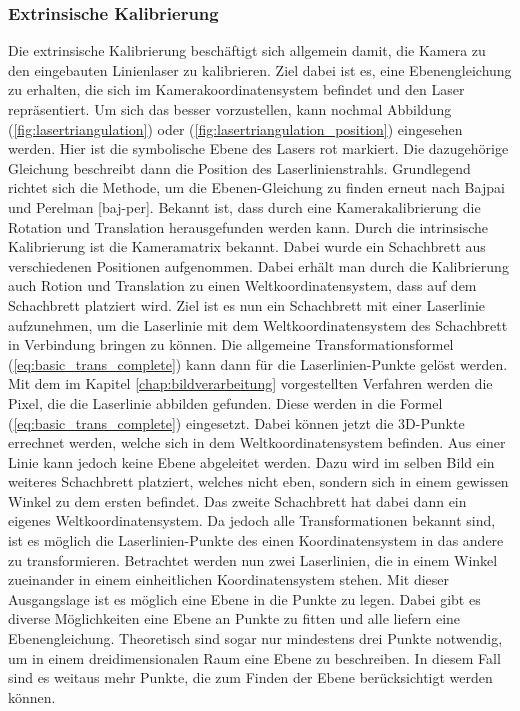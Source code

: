		\subsubsection{Extrinsische Kalibrierung}
		Die extrinsische Kalibrierung beschäftigt sich allgemein damit, die Kamera zu den eingebauten Linienlaser zu kalibrieren. Ziel dabei ist es, eine Ebenengleichung zu erhalten, die sich im Kamerakoordinatensystem befindet und den Laser repräsentiert. Um sich das besser vorzustellen, kann nochmal Abbildung (\ref{fig:lasertriangulation}) oder (\ref{fig:lasertriangulation_position}) eingesehen werden. Hier ist die symbolische Ebene des Lasers rot markiert. Die dazugehörige Gleichung beschreibt dann die Position des Laserlinienstrahls. Grundlegend richtet sich die Methode, um die Ebenen-Gleichung zu finden erneut nach Bajpai und Perelman [baj-per]. \newline
		Bekannt ist, dass durch eine Kamerakalibrierung die Rotation und Translation herausgefunden werden kann. Durch die intrinsische Kalibrierung ist die Kameramatrix bekannt. Dabei wurde ein Schachbrett aus verschiedenen Positionen aufgenommen. Dabei erhält man durch die Kalibrierung auch Rotion und Translation zu einen Weltkoordinatensystem, dass auf dem Schachbrett platziert wird. Ziel ist es nun ein Schachbrett mit einer Laserlinie aufzunehmen, um die Laserlinie mit dem Weltkoordinatensystem des Schachbrett in Verbindung bringen zu können. Die allgemeine Transformationsformel (\ref{eq:basic_trans_complete}) kann dann für die Laserlinien-Punkte gelöst werden. Mit dem im Kapitel \ref{chap:bildverarbeitung} vorgestellten Verfahren werden die Pixel, die die Laserlinie abbilden gefunden. Diese werden in die Formel (\ref{eq:basic_trans_complete}) eingesetzt. Dabei können jetzt die 3D-Punkte errechnet werden, welche sich in dem Weltkoordinatensystem befinden. Aus einer Linie kann jedoch keine Ebene abgeleitet werden. Dazu wird im selben Bild ein weiteres Schachbrett platziert, welches nicht eben, sondern sich in einem gewissen Winkel zu dem ersten befindet. Das zweite Schachbrett hat dabei dann ein eigenes Weltkoordinatensystem. Da jedoch alle Transformationen bekannt sind, ist es möglich die Laserlinien-Punkte des einen Koordinatensystem in das andere zu transformieren. Betrachtet werden nun zwei Laserlinien, die in einem Winkel zueinander in einem einheitlichen Koordinatensystem stehen. Mit dieser Ausgangslage ist es möglich eine Ebene in die Punkte zu legen. Dabei gibt es diverse Möglichkeiten eine Ebene an Punkte zu fitten und alle liefern eine Ebenengleichung. Theoretisch sind sogar nur mindestens drei Punkte notwendig, um in einem dreidimensionalen Raum eine Ebene zu beschreiben. In diesem Fall sind es weitaus mehr Punkte, die zum Finden der Ebene berücksichtigt werden können. \newline
